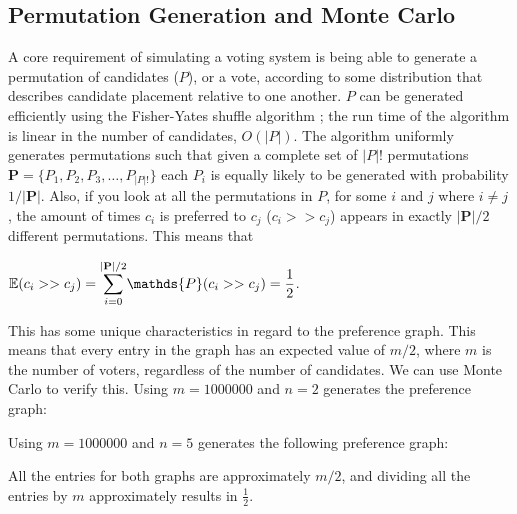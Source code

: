 \documentclass[final,5p,times,twocolumn,authoryear, 10pt]{elsarticle}
\newcommand{\dsum}[2]{\mathlarger{\sum}_{#1}^{#2}}
\begin{document}
\subsection{Permutation Generation and Monte Carlo}
\label{Permutation Generation and Monte Carlo}
A core requirement of simulating a voting system is being able to generate a
permutation of candidates ($P$), or a vote, according to some distribution that
describes candidate placement relative to one another. $P$ can be generated
efficiently using the Fisher-Yates shuffle algorithm \cite{hazra}; the run time
of the algorithm is linear in the number of candidates, $O(|P|)$. The algorithm
uniformly generates permutations such that given a complete set of $|P|!$
permutations $\mathbf{P} = \{P_1, P_2, P_3, \ldots, P_{|P|!}\}$ each $P_i$ is
equally likely to be generated with probability ${1}/{|\mathbf{P}|}$. Also, if
you look at all the permutations in $P$, for some $i$ and $j$ where $i\neq j$,
the amount of times $c_i$ is preferred to $c_j$ ($c_i >> c_j$) appears in
exactly $|\mathbf{P}|/2$ different permutations. This means that 
\begin{center}
    $\mathbb{E}(c_i >> c_j) = \dsum{i=0}{|\mathbf{P}|/2} \mathds{P}(c_i >> c_j) = \dfrac{1}{2}$.
\end{center}
This has some unique characteristics in regard to the preference graph. This
means that every entry in the graph has an expected value of $m/2$, where $m$
is the number of voters, regardless of the number of candidates. We can use
Monte Carlo to verify this. Using $m=1000000$ and $n=2$ generates the
preference graph: 
\begin{center}
\end{center}
Using $m=1000000$ and $n=5$ generates the
following preference graph:
\begin{center}
\end{center}
All the entries for both graphs are approximately $m/2$, and dividing all the
entries by $m$ approximately results in $\frac{1}{2}$.
\end{document}
